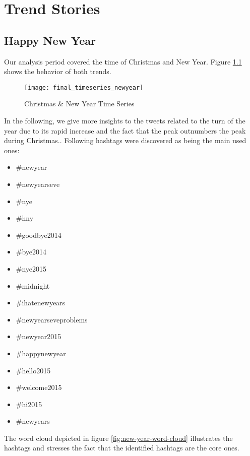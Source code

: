\chapter{Trend Stories}
\label{cha:trend-stories}

\section{Happy New Year}
\label{sec:happy-new-year}
Our analysis period covered the time of Christmas and New Year. Figure \ref{fig:christmas-new-year-time-series} shows the behavior of both trends.  

\begin{figure}[H]
  \centering
        \texttt{[image: final\_timeseries\_newyear]}
  \caption[Christmas \& New Year Time Series]{Christmas \& New Year Time Series}
  \label{fig:christmas-new-year-time-series}
  \vspace{-1.3em}
\end{figure}

In the following, we give more insights to the tweets related to the turn of the year due to its rapid increase and the fact that the peak outnumbers the peak during Christmas.. Following hashtags were discovered as being the main used ones: 
\begin{multicols}{3}
\begin{itemize}[label={}]
  \item \#newyear
  \item \#newyearseve
  \item \#nye
  \item \#hny
  \item \#goodbye2014
  \item \#bye2014
  \item \#nye2015
  \item \#midnight
  \item \#ihatenewyears
  \item \#newyearseveproblems
  \item \#newyear2015
  \item \#happynewyear
  \item \#hello2015
  \item \#welcome2015
  \item \#hi2015
  \item \#newyears
\end{itemize}
\fixspacing
\end{multicols}

The word cloud depicted in figure \ref{fig:new-year-word-cloud} illustrates the hashtags and stresses the fact that the identified hashtags are the core ones.


